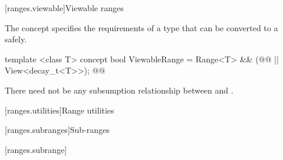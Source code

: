 \setcounter{subsection}{10}
[ranges.viewable]{Viewable ranges}

\pnum The  concept specifies the requirements of a 
type that can be converted to a  safely.

\begin{codeblock}
template <class T>
concept bool ViewableRange =
  Range<T> && (@@ || View<decay_t<T>>); @\removed{// \seebelow}@
\end{codeblock}

\begin{removedblock}
\pnum
There need not be any subsumption relationship between 
and .
\end{removedblock}

[ranges.utilities]{Range utilities}

\setcounter{subsection}{1}
[ranges.subranges]{Sub-ranges}

[ranges.subrange]{}

